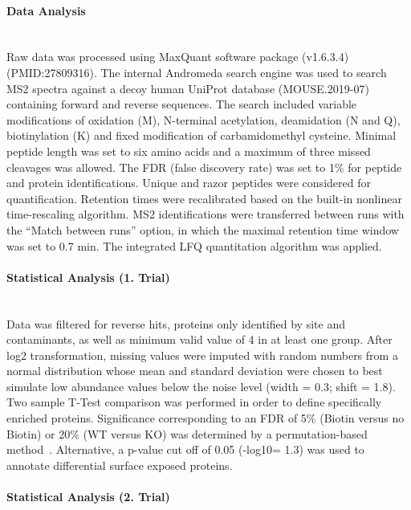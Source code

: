 \documentclass[a4paper,11pt,bibtotocnumbered]{article}
\begin{document}
\paragraph{Data Analysis} $~$ \\

Raw data was processed using MaxQuant software package (v1.6.3.4) (PMID:27809316). The internal Andromeda search engine was used to search MS2 spectra against a decoy human UniProt database (MOUSE.2019-07) containing forward and reverse sequences. The search included variable modifications of oxidation (M), N-terminal acetylation, deamidation (N and Q), biotinylation (K) and fixed modification of carbamidomethyl cysteine. Minimal peptide length was set to six amino acids and a maximum of three missed cleavages was allowed. The FDR (false discovery rate) was set to 1\% for peptide and protein identifications. Unique and razor peptides were considered for quantification. Retention times were recalibrated based on the built-in nonlinear time-rescaling algorithm. MS2 identifications were transferred between runs with the “Match between runs” option, in which the maximal retention time window was set to 0.7 min. The integrated LFQ quantitation algorithm was applied.   

\paragraph{Statistical Analysis (1. Trial)} $~$ \\

Data was filtered for reverse hits, proteins only identified by site and contaminants, as well as minimum valid value of 4 in at least one group. After log2 transformation, missing values were imputed with random numbers from a normal distribution whose mean and standard deviation were chosen to best simulate low abundance values below the noise level (width = 0.3; shift = 1.8). Two sample T-Test comparison was performed in order to define specifically enriched proteins. Significance corresponding to an FDR of 5\% (Biotin versus no Biotin) or 20\% (WT versus KO) was determined by a permutation-based method~\cite{Tusher2001}. Alternative, a p-value cut off of 0.05 (-log10= 1.3) was used to annotate differential surface exposed proteins.

\paragraph{Statistical Analysis (2. Trial)} $~$ \\
\end{document}
